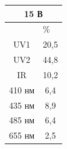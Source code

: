 \documentclass[a4paper,14pt]{extreport}
\begin{document}
	




\begin{tcolorbox}[colback=red!5,colframe=red!75!black,title=Водень] 
\tcblower
	\begin{center}
		\begin{tabular}{|c|c|}
		\hline
		\multicolumn{2}{|c|}{15 В}                       \\ \hline
		\multicolumn{1}{|l|}{} & \multicolumn{1}{l|}{\%} \\ \hline
		UV1                    & 20,5                    \\ \hline
		UV2                    & 44,8                    \\ \hline
		IR                     & 10,2                    \\ \hline
		410  нм                & 6,4                     \\ \hline
		435 нм                 & 8,9                     \\ \hline
		485 нм                 & 6,4                     \\ \hline
		655 нм                 & 2,5                     \\ \hline
		\end{tabular}
	\end{center}
\end{tcolorbox}
\end{document}
